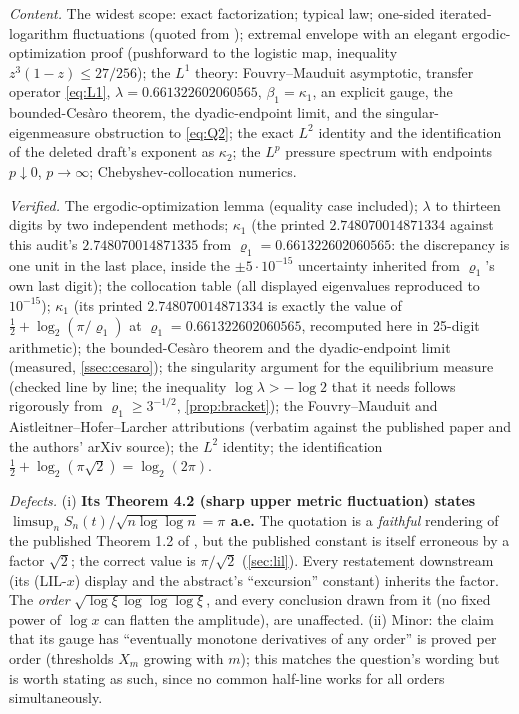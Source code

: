 \documentclass[11pt,oneside]{article}
\theoremstyle{definition}
\theoremstyle{remark}
\begin{document}
\emph{Content.}  The widest scope: exact factorization; typical law;
one-sided iterated-logarithm fluctuations (quoted from \cite{ahl2017});
extremal envelope with an elegant ergodic-optimization proof (pushforward
to the logistic map, inequality $z^3(1-z)\le27/256$); the $L^1$ theory:
Fouvry--Mauduit asymptotic, transfer operator \eqref{eq:L1},
$\lambda=0.661322602060565$, $\beta_1=\kappa_1$, an explicit gauge, the
bounded-Ces\`aro theorem, the dyadic-endpoint limit, and the
singular-eigenmeasure obstruction to \eqref{eq:Q2}; the exact $L^2$
identity and the identification of the deleted draft's exponent as
$\kappa_2$; the $L^p$ pressure spectrum with endpoints
$p\downarrow0$, $p\to\infty$; Chebyshev-collocation numerics.

\emph{Verified.}  The ergodic-optimization lemma (equality case included);
$\lambda$ to thirteen digits by two independent methods; $\kappa_1$
(the printed $2.748070014871334$ against this audit's
$2.748070014871335$ from $\varrho_1=0.661322602060565$: the discrepancy
is one unit in the last place, inside the $\pm5\cdot10^{-15}$ uncertainty
inherited from $\varrho_1$'s own last digit);
the collocation table (all displayed eigenvalues reproduced to
$10^{-15}$); $\kappa_1$ (its printed $2.748070014871334$ is exactly the
value of $\tfrac12+\log_2(\pi/\varrho_1)$ at
$\varrho_1=0.661322602060565$, recomputed here in 25-digit arithmetic);
the bounded-Ces\`aro theorem and the dyadic-endpoint limit
(measured, \cref{ssec:cesaro}); the singularity argument for the
equilibrium measure (checked line by line; the inequality
$\log\lambda>-\log2$ that it needs follows rigorously from
$\varrho_1\ge3^{-1/2}$, \cref{prop:bracket}); the Fouvry--Mauduit and
Aistleitner--Hofer--Larcher attributions (verbatim against the published
paper and the authors' arXiv source); the $L^2$ identity; the
identification $\tfrac12+\log_2(\pi\sqrt2)=\log_2(2\pi)$.

\emph{Defects.}
(i) \textbf{Its Theorem 4.2 (sharp upper metric fluctuation) states
$\limsup_nS_n(t)/\sqrt{n\log\log n}=\pi$ a.e.}  The quotation is a
\emph{faithful} rendering of the published Theorem 1.2 of \cite{ahl2017},
but the published constant is itself erroneous by a factor $\sqrt2$; the
correct value is $\pi/\sqrt2$ (\cref{sec:lil}).  Every restatement
downstream (its (LIL-$x$) display and the abstract's
``excursion'' constant) inherits the factor.  The \emph{order}
$\sqrt{\log\xi\,\log\log\log\xi}$, and every conclusion drawn from it
(no fixed power of $\log x$ can flatten the amplitude), are unaffected.
(ii) Minor: the claim that its gauge has ``eventually monotone
derivatives of any order'' is proved per order (thresholds $X_m$ growing
with $m$); this matches the question's wording but is worth stating as
such, since no common half-line works for all orders simultaneously.
\end{document}
